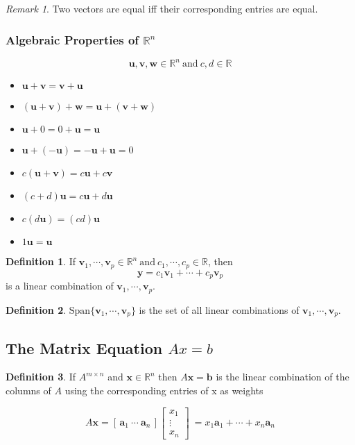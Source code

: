 \documentclass{article}
\renewcommand{\vec}[1]{\textbf{#1}}
\theoremstyle{definition}
\newtheorem{definition}{Definition}[section]
\theoremstyle{remark}
\newtheorem*{remark}{Remark}
\theoremstyle{remark}
\theoremstyle{remark}
\newtheorem*{it follows}{It follows}
\begin{document}
\begin{remark}
  Two vectors are equal iff their corresponding entries are equal.
\end{remark}

\subsubsection{Algebraic Properties of $\mathbb{R}^n$}

\begin{equation}
  \vec{u}, \vec{v}, \vec{w} \in \mathbb{R}^n\ \text{and}\ c, d \in \mathbb{R}
\end{equation}

\begin{itemize}
  \item $\vec{u} + \vec{v} = \vec{v} + \vec{u}$
  \item $(\vec{u} + \vec{v}) + \vec{w} = \vec{u} + (\vec{v} + \vec{w})$
  \item $\vec{u} + 0 = 0 + \vec{u} = \vec{u}$
  \item $\vec{u} + (-\vec{u}) = -\vec{u} + \vec{u} = 0$
  \item $c(\vec{u} + \vec{v}) = c\vec{u} + c\vec{v}$
  \item $(c + d)\vec{u} = c\vec{u} + d\vec{u}$
  \item $c(d\vec{u}) = (cd)\vec{u}$
  \item $1\vec{u} = \vec{u}$
\end{itemize}

\begin{definition}
  If $\vec{v}_1, \cdots, \vec{v}_p \in \mathbb{R}^n\ \text{and}\ c_1, \cdots, c_p \in \mathbb{R}$, then
  $$\vec{y} = c_1 \vec{v}_1 + \cdots + c_p \vec{v}_p$$
  is a linear combination of $\vec{v}_1, \cdots, \vec{v}_p$.
\end{definition}

\begin{definition}
  $\text{Span}\{\vec{v}_1, \cdots, \vec{v}_p\}$ is the set of all linear combinations of $\vec{v}_1, \cdots, \vec{v}_p$.
\end{definition}

\subsection{The Matrix Equation $Ax = b$}

\begin{definition}
  If $A^{m \times n}$ and $\vec{x} \in \mathbb{R}^n$ then $A\vec{x}=\vec{b}$ is the linear combination of the columns of $A$ using the corresponding entries of x as weights

  \begin{equation*}
    A\vec{x} = \left[ \, \vec{a}_1\ \cdots\ \vec{a}_n  \, \right]
    \begin{bmatrix}
      x_1 \\
      \vdots  \\
      x_n
    \end{bmatrix}\
    = x_1 \vec{a}_1 + \cdots + x_n \vec{a}_n
  \end{equation*}
\end{definition}
\end{document}
